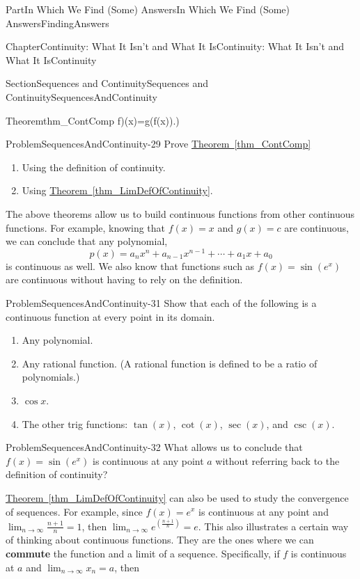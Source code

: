 \documentclass[oneside,10pt,]{book}
\newcommand{\xreffont}{\relax}
\newcommand{\terminology}[1]{\textbf{#1}}
\numberwithin{equation}{part}
\def\limit#1#2#3{{\displaystyle\lim_{#1\rightarrow #2}#3}}
\begin{document}
\begin{partptx}{Part}{In Which We Find (Some) Answers}{}{In Which We Find (Some) Answers}{}{}{FindingAnswers}
\begin{chapterptx}{Chapter}{Continuity: What It Isn't and What It Is}{}{Continuity: What It Isn't and What It Is}{}{}{Continuity}
\begin{sectionptx}{Section}{Sequences and Continuity}{}{Sequences and Continuity}{}{}{SequencesAndContinuity}
\begin{theorem}{Theorem}{}{}{thm_ContComp}
f)(x)=g(f(x))\).)%
\end{theorem}
\begin{problem}{Problem}{}{SequencesAndContinuity-29}%
Prove \hyperref[thm_ContComp]{Theorem~{\xreffont\ref{thm_ContComp}}}%
\begin{enumerate}[font=\bfseries,label=(\alph*),ref=\alph*]%
\item{}Using the definition of continuity.%
\item{}Using \hyperref[thm_LimDefOfContinuity]{Theorem~{\xreffont\ref{thm_LimDefOfContinuity}}}.%
\end{enumerate}%
\end{problem}
The above theorems allow us to build continuous functions from other continuous functions.  For example, knowing that \(f(x)=x\) and \(g(x)=c\) are continuous, we can conclude that any polynomial,%
\begin{equation*}
p(x)=a_nx^n+a_{n-1}x^{n-1}+\cdots+a_1x+a_0
\end{equation*}
is continuous as well.  We also know that functions such as \(f(x)=\sin\left(e^x\right)\) are continuous without having to rely on the definition.%
\begin{problem}{Problem}{}{SequencesAndContinuity-31}%
Show that each of the following is a continuous function at every point in its domain.%
\begin{enumerate}[font=\bfseries,label=(\alph*),ref=\alph*]%
\item{}Any polynomial.%
\item{}Any rational function. (A rational function is defined to be a ratio of polynomials.)%
\item{}\(\cos x\).%
\item{}The other trig functions: \(\tan(x)\), \(\cot(x)\), \(\sec(x)\), and \(\csc(x)\).%
\end{enumerate}%
\end{problem}
\begin{problem}{Problem}{}{SequencesAndContinuity-32}%
What allows us to conclude that \(f(x)=\sin\left(e^x\right)\) is continuous at any point \(a\) without referring back to the definition of continuity?%
\end{problem}
\hyperref[thm_LimDefOfContinuity]{Theorem~{\xreffont\ref{thm_LimDefOfContinuity}}} can also be used to study the convergence of sequences.  For example, since \(f(x)=e^x\) is continuous at any point and \(\limit{n}{\infty}{\frac{n+1}{n}}=1\), then \(\limit{n}{\infty}{e^{\left(\frac{n+1}{n}\right)}}=e\). This also illustrates a certain way of thinking about continuous functions.  They are the ones where we can \terminology{commute} the function and a limit of a sequence.  Specifically, if \(f\) is continuous at \(a\) and \(\limit{n}{\infty}{x_n}=a\), then%

\end{sectionptx}
\end{chapterptx}
\end{partptx}
\end{document}
